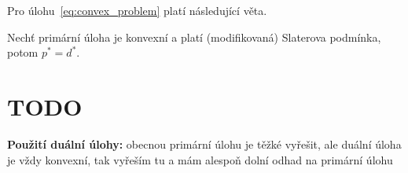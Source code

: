 Pro úlohu~\ref{eq:convex_problem} platí následující věta.
\begin{vt}[Slaterova]
    Nechť primární úloha je konvexní a platí (modifikovaná) Slaterova podmínka, potom $p^* = d^*$.
\end{vt}


\section*{TODO}
\textbf{Použití duální úlohy:} obecnou primární úlohu je těžké vyřešit, ale duální úloha je vždy konvexní, tak vyřeším tu a mám alespoň dolní odhad na primární úlohu
